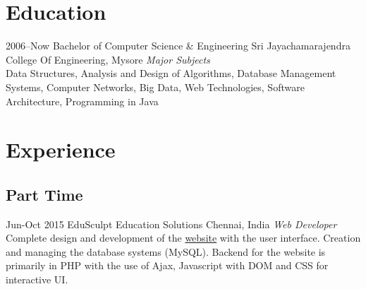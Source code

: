 \documentclass[]{friggeri-cv} %
\begin{document}
\section{Education}

\begin{entrylist}

\entry
{2006--Now}
{Bachelor {\normalfont of Computer Science \& Engineering}}
{Sri Jayachamarajendra College Of Engineering, Mysore}
{\emph{Major Subjects} \\ Data Structures, Analysis and Design of Algorithms, Database Management Systems, Computer Networks, Big Data, Web Technologies, Software Architecture, Programming in Java \newline}

\end{entrylist}


\section{Experience}

\subsection{Part Time}

\begin{entrylist}

\entry
{Jun-Oct 2015}
{EduSculpt Education Solutions}
{Chennai, India}
{\emph{Web Developer} \\
Complete design and development of the \href{http://www.edusculpt.com}{website} with the user interface. Creation and managing the database systems (MySQL). Backend for the website is primarily in PHP with the use of Ajax, Javascript with DOM and CSS for interactive UI. \newline}


\end{entrylist}


\end{document}

